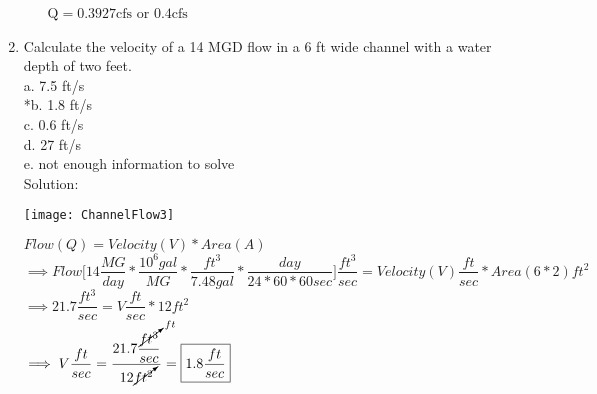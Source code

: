 \documentclass{article}
\begin{document}
\begin{enumerate}
\begin{enumerate}
$\mathrm{Q}=0.3927 \mathrm{cfs}$ or $0.4 \mathrm{cfs}$
\end{enumerate}

\newpage
\item Calculate the velocity of a 14 MGD flow in a 6 ft wide channel with a water depth of two feet.\\
a.	7.5 ft/s\\
*b.	1.8  ft/s\\
c.	0.6 ft/s\\
d.	27 ft/s\\
e.	not enough information to solve\\
Solution:\\
\begin{center}
\texttt{[image: ChannelFlow3]}
\end{center}
$Flow (Q) = Velocity (V) * Area (A)$\\
$\implies Flow\Big[ 14 \dfrac{MG}{day}* \dfrac{10^6 gal}{MG} * \dfrac{ft^3}{7.48 gal}*\dfrac{day}{24*60*60sec}\Big]\dfrac{ft^3}{sec} = Velocity(V) \dfrac{ft}{sec}* Area (6 * 2) ft ^2$\\
\vspace{0.2cm}
$\implies 21.7 \dfrac{ft^3}{sec}= V\dfrac{ft}{sec}*12ft^2$\\
$\implies V \dfrac{ft}{sec}= \dfrac{21.7\dfrac{\cancelto{ft}{ft^3}}{sec}}{12\cancelto{}{ft^2}}= \boxed{1.8\dfrac{ft}{sec}}$\\
\end{enumerate}
\end{document}

